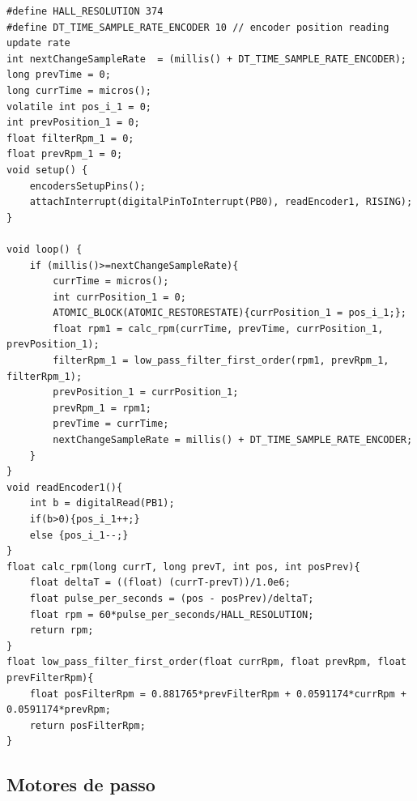 \lstset{language=C}
\begin{lstlisting}
#define HALL_RESOLUTION 374
#define DT_TIME_SAMPLE_RATE_ENCODER 10 // encoder position reading update rate
int nextChangeSampleRate  = (millis() + DT_TIME_SAMPLE_RATE_ENCODER);
long prevTime = 0;
long currTime = micros();
volatile int pos_i_1 = 0;
int prevPosition_1 = 0;
float filterRpm_1 = 0;
float prevRpm_1 = 0;
void setup() {
    encodersSetupPins();
    attachInterrupt(digitalPinToInterrupt(PB0), readEncoder1, RISING);   
}

void loop() {
    if (millis()>=nextChangeSampleRate){
        currTime = micros();
        int currPosition_1 = 0;
        ATOMIC_BLOCK(ATOMIC_RESTORESTATE){currPosition_1 = pos_i_1;};
        float rpm1 = calc_rpm(currTime, prevTime, currPosition_1, prevPosition_1);
        filterRpm_1 = low_pass_filter_first_order(rpm1, prevRpm_1, filterRpm_1);
        prevPosition_1 = currPosition_1;
        prevRpm_1 = rpm1;
        prevTime = currTime;
        nextChangeSampleRate = millis() + DT_TIME_SAMPLE_RATE_ENCODER;
    }
}
void readEncoder1(){ 
    int b = digitalRead(PB1);
    if(b>0){pos_i_1++;}
    else {pos_i_1--;}
}
float calc_rpm(long currT, long prevT, int pos, int posPrev){
    float deltaT = ((float) (currT-prevT))/1.0e6;
    float pulse_per_seconds = (pos - posPrev)/deltaT;
    float rpm = 60*pulse_per_seconds/HALL_RESOLUTION;
    return rpm;
}
float low_pass_filter_first_order(float currRpm, float prevRpm, float prevFilterRpm){
    float posFilterRpm = 0.881765*prevFilterRpm + 0.0591174*currRpm + 0.0591174*prevRpm;
    return posFilterRpm;
}
\end{lstlisting}

\subsection{Motores de passo}

\lipsum[1]





